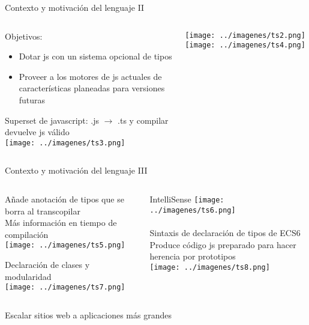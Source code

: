 \documentclass{beamer}
\begin{document}
\begin{frame}{Contexto y motivación del lenguaje II}
\begin{columns}[T] %
	\begin{column}[T]{7cm} %
		Objetivos:
		\begin{itemize}
			\item Dotar js con un sistema opcional de tipos
			\item Proveer a los motores de js actuales de características planeadas para versiones futuras
		\end{itemize}
		Superset de javascript: .js $\to$ .ts y compilar devuelve js válido \\
		
		\texttt{[image: ../imagenes/ts3.png]}
	
		
	\end{column}
	\begin{column}[T]{3cm} %
		\texttt{[image: ../imagenes/ts2.png]}
		\texttt{[image: ../imagenes/ts4.png]}
	\end{column}
\end{columns}

\end{frame}

\small
\begin{frame}{Contexto y motivación del lenguaje III}
\begin{columns}[t, onlytextwidth]
	\begin{column}[T]{.6\textwidth} %
		
		Añade anotación de tipos que se borra al transcopilar\\
		Más información en tiempo de compilación \\
		\texttt{[image: ../imagenes/ts5.png]}
		
		Declaración de clases y modularidad \\
		\texttt{[image: ../imagenes/ts7.png]}
		
		
	\end{column}
	\begin{column}[T]{0.3\textwidth} %
		IntelliSense
		\texttt{[image: ../imagenes/ts6.png]} \\ 
		\hfill \break
		\\
		
		Sintaxis de declaración de tipos de ECS6 \\
		Produce código js preparado para hacer
		herencia por prototipos \\
		
		\texttt{[image: ../imagenes/ts8.png]}
	
	\end{column}
\end{columns}
Escalar sitios web a aplicaciones más grandes

\end{frame}
\end{document}
